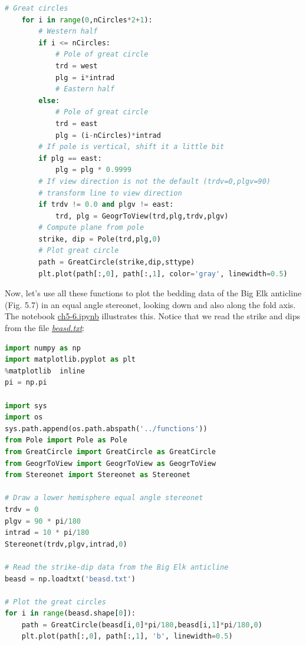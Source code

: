 \documentclass[a4paper , 12pt]{book}
\begin{document}
\begin{lstlisting}[language=Python, frame=single]
    # Great circles
    for i in range(0,nCircles*2+1):
        # Western half
        if i <= nCircles:
            # Pole of great circle
            trd = west
            plg = i*intrad
            # Eastern half
        else:
            # Pole of great circle
            trd = east
            plg = (i-nCircles)*intrad
        # If pole is vertical, shift it a little bit
        if plg == east:
            plg = plg * 0.9999
        # If view direction is not the default (trdv=0,plgv=90)
        # transform line to view direction
        if trdv != 0.0 and plgv != east:
            trd, plg = GeogrToView(trd,plg,trdv,plgv)
        # Compute plane from pole
        strike, dip = Pole(trd,plg,0)
        # Plot great circle
        path = GreatCircle(strike,dip,sttype)
        plt.plot(path[:,0], path[:,1], color='gray', linewidth=0.5)
\end{lstlisting}

Now, let's use all these functions to plot the bedding data of the Big Elk anticline (Fig. 5.7) in an equal angle stereonet, looking down and also along the fold axis. The notebook \href{https://github.com/nfcd/compGeo/blob/master/source/notebooks/ch5-6.ipynb}{ch5-6.ipynb} illustrates this. Notice that we read the strike and dips from the file \href{https://github.com/nfcd/compGeo/blob/master/source/data/ch5-6/beasd.txt}{\textit{beasd.txt}}:

\begin{center}
\begin{lstlisting}[language=Python, frame=single]
import numpy as np
import matplotlib.pyplot as plt
%matplotlib  inline
pi = np.pi

import sys
import os
sys.path.append(os.path.abspath('../functions'))
from Pole import Pole as Pole
from GreatCircle import GreatCircle as GreatCircle
from GeogrToView import GeogrToView as GeogrToView
from Stereonet import Stereonet as Stereonet

# Draw a lower hemisphere equal angle stereonet
trdv = 0
plgv = 90 * pi/180
intrad = 10 * pi/180
Stereonet(trdv,plgv,intrad,0)

# Read the strike-dip data from the Big Elk anticline
beasd = np.loadtxt('beasd.txt')

# Plot the great circles
for i in range(beasd.shape[0]):
    path = GreatCircle(beasd[i,0]*pi/180,beasd[i,1]*pi/180,0)
    plt.plot(path[:,0], path[:,1], 'b', linewidth=0.5) 
\end{lstlisting}
\end{center}
\end{document}
